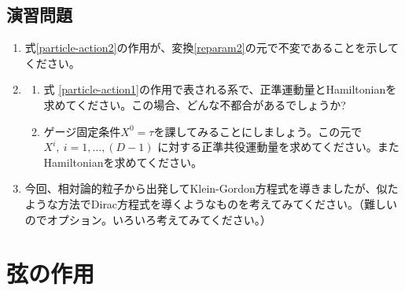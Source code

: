\documentclass[report,paper=a4, fontsize=12pt, line_length=16cm, number_of_lines=33,dvipdfmx]{jlreq}
\numberwithin{equation}{chapter}
\numberwithin{equation}{section}
\begin{document}
\subsection*{演習問題}
\begin{enumerate}
 \item 式\eqref{particle-action2}の作用が、変換\eqref{reparam2}の元で不変であることを示してください。
 \item
\begin{enumerate}
 \item 式 \eqref{particle-action1}の作用で表される系で、正準運動量とHamiltonianを求めてください。この場合、どんな不都合があるでしょうか?
 \item ゲージ固定条件$X^{0}=\tau$を課してみることにしましょう。この元で$X^{i},\ i=1,\dots,(D-1)$ に対する正準共役運動量を求めてください。またHamiltonianを求めてください。
\end{enumerate}  
 \item 今回、相対論的粒子から出発してKlein-Gordon方程式を導きましたが、似たような方法でDirac方程式を導くようなものを考えてみてください。（難しいのでオプション。いろいろ考えてみてください。）
\end{enumerate}


\section{弦の作用}
\end{document}
